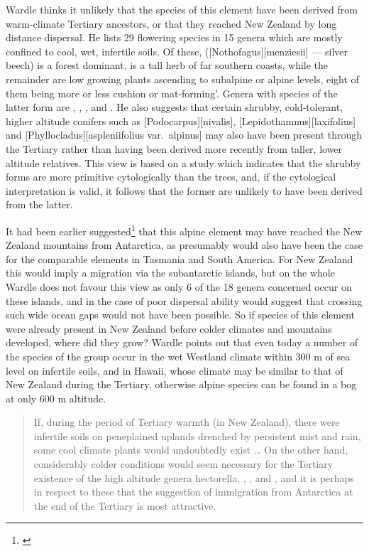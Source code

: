 Wardle thinks it unlikely that the species of this element have been derived from warm-climate Tertiary ancestors, or that they reached New Zealand by long distance dispersal.
He lists 29 flowering species in 15 genera which are mostly confined to cool, wet, infertile soils.
Of these,  ([Nothofagus][menziesii] --- silver beech) is a forest dominant,  is a tall herb of far southern coasts, while the remainder are low growing plants ascending to subalpine or alpine levels, eight of them being more or less cushion or mat-forming'.
Genera with species of the latter form are , , ,  and .
He also suggests that certain shrubby, cold-tolerant, higher altitude conifers such as [Podocarpus][nivalis], [Lepidothamnus][laxifolius] and [Phyllocladus][aspleniifolius var.\ alpinus] may also have been present through the Tertiary rather than having been derived more recently from taller, lower altitude relatives.
This view is based on a study which indicates that the shrubby forms are more primitive cytologically than the trees, and, if the cytological interpretation is valid, it follows that the former are unlikely to have been derived from the latter.

It had been earlier suggested\footnote{\cite{fleming1963age}} that this alpine element may have reached the New Zealand mountains from Antarctica, as presumably would also have been the case for the comparable elements in Tasmania and South America.
For New Zealand this would imply a migration via the subantarctic islands, but on the whole Wardle does not favour this view as only 6 of the 18 genera concerned occur on these islands, and in the case of  poor dispersal ability would suggest that crossing such wide ocean gaps would not have been possible.
So if species of this element were already present in New Zealand before colder climates and mountains developed, where did they grow? Wardle points out that even today a number of the species of the group occur in the wet Westland climate within 300 m of sea level on infertile soils, and in Hawai{\okina}i, whose climate may be similar to that of New Zealand during the Tertiary, otherwise alpine species can be found in a bog at only 600 m altitude.

\begin{quote}
	If, during the period of Tertiary warmth (in New Zealand), there were infertile soils on peneplained uplands drenched by persistent mist and rain, some cool climate plants would undoubtedly exist … On the other hand, considerably colder conditions would seem necessary for the Tertiary existence of the high altitude genera hectorella, , ,  and , and it is perhaps in respect to these that the suggestion of immigration from Antarctica at the end of the Tertiary is most attractive.
\end{quote}

